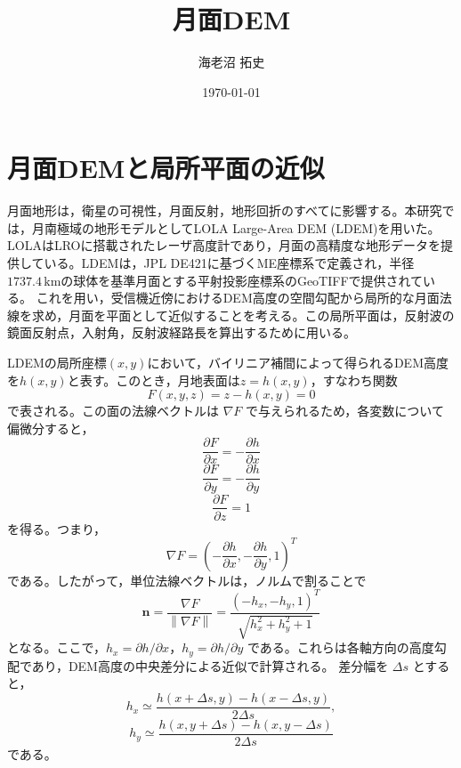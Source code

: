 \documentclass[11pt]{jarticle}
\title{月面DEM}
\author{海老沼 拓史}
\date{\today}
\begin{document}
\maketitle

\section{月面DEMと局所平面の近似}

月面地形は，衛星の可視性，月面反射，地形回折のすべてに影響する。本研究では，月南極域の地形モデルとしてLOLA Large-Area DEM (LDEM)を用いた\cite{Barker}。LOLAはLROに搭載されたレーザ高度計であり，月面の高精度な地形データを提供している。LDEMは，JPL DE421に基づくME座標系で定義され，半径$1737.4\,\mathrm{km}$の球体を基準月面とする平射投影座標系のGeoTIFFで提供されている\cite{PGDA}。
これを用い，受信機近傍におけるDEM高度の空間勾配から局所的な月面法線を求め，月面を平面として近似することを考える。この局所平面は，反射波の鏡面反射点，入射角，反射波経路長を算出するために用いる。

LDEMの局所座標$(x,y)$において，バイリニア補間によって得られるDEM高度を$h(x,y)$と表す。このとき，月地表面は$z=h(x,y)$，すなわち関数
\begin{equation}
F(x,y,z)=z-h(x,y)=0
\end{equation}
で表される。この面の法線ベクトルは $\nabla F$ で与えられるため，各変数について偏微分すると，
\begin{equation}
\frac{\partial F}{\partial x} = -\frac{\partial h}{\partial x}
\end{equation}
\begin{equation}
\frac{\partial F}{\partial y} = -\frac{\partial h}{\partial y}
\end{equation}
\begin{equation}
\frac{\partial F}{\partial z} = 1
\end{equation}
を得る。つまり，
\begin{equation}
\nabla F = \left(-\frac{\partial h}{\partial x},  -\frac{\partial h}{\partial y}, 1\right)^T
\end{equation}
である。したがって，単位法線ベクトルは，ノルムで割ることで
\begin{equation}
\mathbf{n} = \frac{\nabla F}{\left\|\nabla F\right\|}
=
\frac{
(-h_x,-h_y,1)^T
}{
\sqrt{h_x^2+h_y^2+1}
}
\label{eq:dem_surface_normal}
\end{equation}
となる。ここで，$h_x=\partial h/\partial x$，$h_y=\partial h/\partial y$ である。これらは各軸方向の高度勾配であり，DEM高度の中央差分による近似で計算される。
差分幅を $\Delta s$ とすると，
\begin{equation}
    h_x
    \simeq
    \frac{h(x+\Delta s,y)-h(x-\Delta s,y)}
         {2\Delta s},
\end{equation}
\begin{equation}
    h_y
    \simeq
    \frac{h(x,y+\Delta s)-h(x,y-\Delta s)}
         {2\Delta s}
\end{equation}
である。
\end{document}
